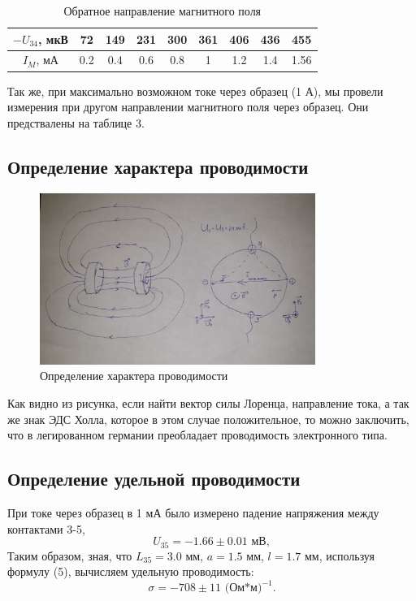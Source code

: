 \documentclass[a4paper, 14pt]{extarticle}%
\newcommand\ECaption[1]{%
     \captionsetup{font=footnotesize}%
     \caption{#1}}
\begin{document}
\begin{table}[h!]
\begin{center}
\begin{tabular}{|c|c|c|c|c|c|c|c|c|}
\hline
\rowcolor[HTML]{FFFFC7} 
$-U_{34}$, мкВ & 72  & 149 & 231 & 300 & 361 & 406 & 436 & 455  \\ \hline
$I_M$, мА     & 0.2 & 0.4 & 0.6 & 0.8 & 1   & 1.2 & 1.4 & 1.56 \\ \hline
\end{tabular}
\ECaption{Обратное направление магнитного поля}
\end{center}
\end{table}
Так же, при максимально возможном токе через образец (1 А), мы провели измерения при другом направлении магнитного поля через образец. Они предствалены на таблице 3.
\subsection*{Определение характера проводимости}

\begin{figure}[h!]
\begin{center}
\includegraphics[width=0.8\textwidth]{prov}
\end{center}
\ECaption{Определение характера проводимости}
\end{figure}

Как видно из рисунка, если найти вектор силы Лоренца, направление тока, а так же знак ЭДС Холла, которое в этом случае положительное, то можно заключить, что в легированном германии преобладает проводимость электронного типа.

\subsection*{Определение удельной проводимости}
При токе через образец в 1 мА было измерено падение напряжения между контактами 3-5, 
\begin{equation}
U_{35} = -1.66\pm0.01 \text{ мВ},
\end{equation}
Таким образом, зная, что $L_{35} = 3.0$ мм, $a = 1.5$ мм, $l = 1.7$ мм, используя формулу (5), вычисляем удельную проводимость:
\begin{equation}
\sigma = -708\pm11 \text{ (Ом*м)}^{-1}.
\end{equation}
\end{document}
